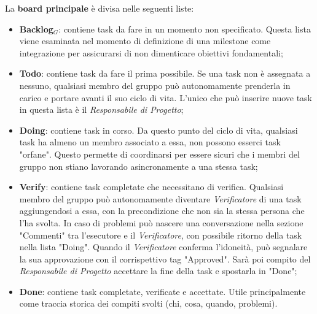 La \textbf{board principale} è divisa nelle seguenti liste:
\begin{itemize}
  \item \textbf{Backlog}$_G$: contiene task da fare in un momento non specificato. Questa lista viene esaminata nel momento di definizione di una milestone come integrazione per assicurarsi di non dimenticare obiettivi fondamentali;
  \item \textbf{Todo}: contiene task da fare il prima possibile. Se una task non è assegnata a nessuno, qualsiasi membro del gruppo può autonomamente prenderla in carico e portare avanti il suo ciclo di vita. L'unico che può inserire nuove task in questa lista è il \textit{Responsabile di Progetto};
  \item \textbf{Doing}: contiene task in corso. Da questo punto del ciclo di vita, qualsiasi task ha almeno un membro associato a essa, non possono esserci task "orfane". Questo permette di coordinarsi per essere sicuri che i membri del gruppo non stiano lavorando asincronamente a una stessa task;
  \item \textbf{Verify}: contiene task completate che necessitano di verifica. Qualsiasi membro del gruppo può autonomamente diventare \textit{Verificatore} di una task aggiungendosi a essa, con la precondizione che non sia la stessa persona che l'ha svolta. In caso di problemi può nascere una conversazione nella sezione "Commenti" tra l'esecutore e il \textit{Verificatore}, con possibile ritorno della task nella lista "Doing". Quando il \textit{Verificatore} conferma l'idoneità, può segnalare la sua approvazione con il corrispettivo tag "Approved". Sarà poi compito del \textit{Responsabile di Progetto} accettare la fine della task e spostarla in "Done";
  \item \textbf{Done}: contiene task completate, verificate e accettate. Utile principalmente come traccia storica dei compiti svolti (chi, cosa, quando, problemi).
\end{itemize}

